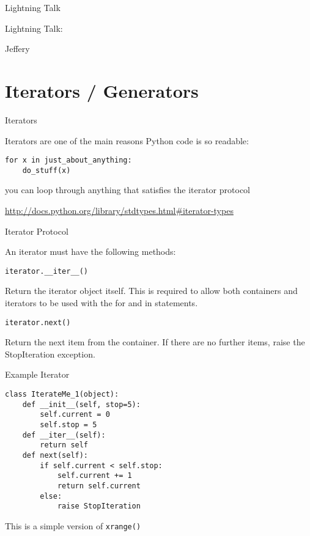 \documentclass{beamer}
\begin{document}
\begin{frame}{Lightning Talk}

{\centering

\vfill
{\LARGE Lightning Talk:  }

\vfill
{\Huge Jeffery}

\vfill
}
\end{frame}

\section{Iterators / Generators}

\begin{frame}[fragile]{Iterators}

{\Large Iterators are one of the main reasons Python code is so readable:}

\begin{verbatim}
for x in just_about_anything:
    do_stuff(x)
\end{verbatim}

{\Large you can loop through anything that satisfies the iterator protocol}

\vfill
\url{http://docs.python.org/library/stdtypes.html#iterator-types}
\end{frame} 

\begin{frame}[fragile]{Iterator Protocol}

{\Large An iterator must have the following methods:}

\begin{verbatim}
iterator.__iter__()
\end{verbatim}

Return the iterator object itself. This is required to allow both containers
and iterators to be used with the for and in statements.

\begin{verbatim}
iterator.next()
\end{verbatim}

Return the next item from the container. If there are no further items,
raise the StopIteration exception.

\end{frame} 


\begin{frame}[fragile]{Example Iterator}

\begin{verbatim}
class IterateMe_1(object):
    def __init__(self, stop=5):
        self.current = 0
        self.stop = 5
    def __iter__(self):
        return self
    def next(self):
        if self.current < self.stop:
            self.current += 1
            return self.current
        else:
            raise StopIteration
\end{verbatim}

{\Large This is a simple version of \verb|xrange()|}

\end{frame} 
\end{document}
